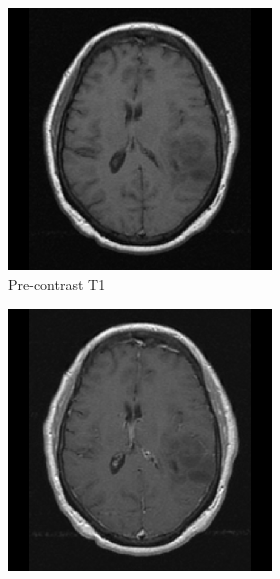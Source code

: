 \begin{subappendices}
\begin{figure}
    \begin{subfigure}[b]{0.88\textwidth}
        \centering
        \hfill
        \begin{subfigure}[b]{0.24\textwidth}
        \includegraphics[width=\textwidth]{Figures/TCGA-DU-6400_T1.png}
        \caption*{Pre-contrast \acrshort{T1}}
        \end{subfigure}
        \hfill
        \begin{subfigure}[b]{0.24\textwidth}
        \includegraphics[width=\textwidth]{Figures/TCGA-DU-6400_T1GD.png}

\end{subfigure}
\end{subfigure}
\end{figure}
\end{subappendices}
